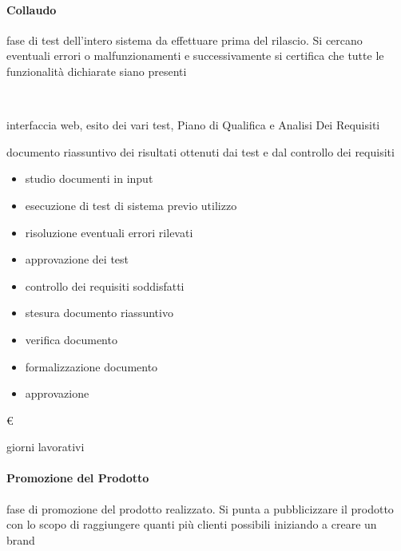\paragraph{Collaudo}

\item[Descrizione:] fase di test dell’intero sistema da effettuare prima del rilascio. Si cercano
eventuali errori o malfunzionamenti e successivamente si certifica che tutte le funzionalità dichiarate siano presenti \\

\item[Responsabile:] \\

\item[Input:] interfaccia web, esito dei vari test, Piano di Qualifica e Analisi Dei Requisiti \\

\item[Output:] documento riassuntivo dei risultati ottenuti dai test e dal controllo dei requisiti \\

\item[Attività:]
\begin{itemize}
\item studio documenti in input
\item esecuzione di test di sistema previo utilizzo
\item risoluzione eventuali errori rilevati
\item approvazione dei test
\item controllo dei requisiti soddisfatti
\item stesura documento riassuntivo
\item verifica documento
\item formalizzazione documento
\item approvazione
\end{itemize}
\item[Costo:] \euro \\
\item[Tempi di realizzazione:]  giorni lavorativi


 \paragraph{Promozione del Prodotto}
\item[Descrizione:] fase di promozione del prodotto realizzato. Si punta a pubblicizzare il
prodotto con lo scopo di raggiungere quanti più clienti possibili iniziando a creare un brand \\

